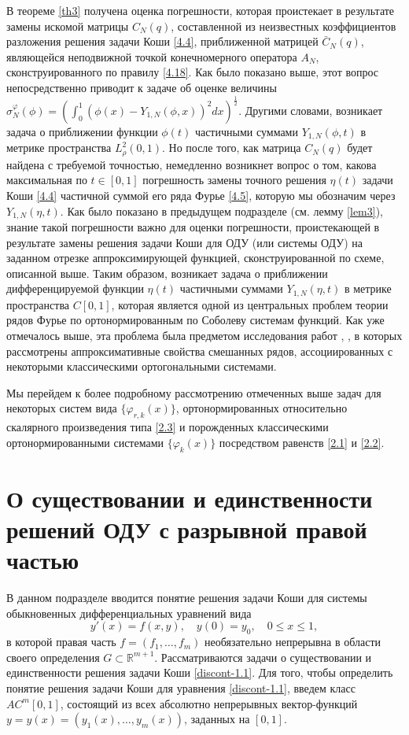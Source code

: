 В теореме \ref{th3} получена оценка  погрешности, которая проистекает в результате замены искомой матрицы $C_N(q)$, составленной из неизвестных коэффициентов  разложения решения задачи Коши \eqref{4.4}, приближенной матрицей $\bar C_N(q)$, являющейся неподвижной точкой конечномерного оператора $A_N$, сконструированного по правилу \eqref{4.18}.
Как было показано выше, этот вопрос непосредственно приводит к задаче об оценке величины  $\sigma_N^\varphi(\phi)=(\int_{0}^1(\phi(x)- Y_{1,N}(\phi,x))^2 dx)^\frac12$. Другими словами, возникает задача о приближении функции $\phi(t)$ частичными суммами $Y_{1,N}(\phi,t)$  в метрике пространства $L^2_\rho(0,1)$.
Но после того, как  матрица $C_N(q)$ будет найдена с требуемой точностью, немедленно возникнет вопрос о том, какова максимальная по $t\in[0,1]$ погрешность замены точного решения $\eta(t)$ задачи Коши \eqref{4.4} частичной суммой его ряда Фурье \eqref{4.5}, которую мы обозначим через  $Y_{1,N}(\eta,t)$. Как было показано в предыдущем подразделе (см. лемму \ref{lem3}), знание такой погрешности важно для оценки погрешности, проистекающей в результате замены решения задачи Коши для ОДУ (или системы ОДУ) на заданном отрезке  аппроксимирующей функцией, сконструированной по схеме, описанной выше.  Таким образом, возникает задача о приближении  дифференцируемой функции $\eta(t)$ частичными суммами $Y_{1,N}(\eta,t)$ в метрике пространства $C[0,1]$, которая является одной из центральных проблем теории рядов Фурье по ортонормированным по Соболеву системам функций. Как уже отмечалось выше, эта проблема  была предметом исследования  работ  \cite{Shar11, Shar2003, Shar2006, Shar2008, Shar19, Shar18, sharap3, Shar_Dag_Elec, SHII, Shar2017, SharSMJ2017}, \cite{SharIzv2018},  в которых  рассмотрены аппроксимативные свойства смешанных рядов, ассоциированных с некоторыми классическими ортогональными системами.

Мы перейдем к более подробному рассмотрению отмеченных выше задач для некоторых  систем вида $\{\varphi_{r,k}(x)\}$, ортонормированных относительно скалярного произведения типа \eqref{2.3} и порожденных классическими ортонормированными системами $\{\varphi_k(x)\}$ посредством равенств  \eqref{2.1} и \eqref{2.2}.



\section{О существовании и единственности решений ОДУ с разрывной правой частью}

В данном подразделе вводится понятие решения задачи Коши для системы обыкновенных дифференциальных уравнений вида
\begin{equation}\label{discont-1.1}
y'(x)=f(x,y),\quad y(0)=y_0, \quad 0\le x\le 1,
\end{equation}
в которой правая часть  $f=(f_1,\ldots,f_m)$ необязательно непрерывна в области своего определения $G\subset\mathbb{R}^{m+1}$. Рассматриваются задачи о существовании и единственности решения задачи Коши \eqref{discont-1.1}. Для того, чтобы определить понятие  решения задачи Коши для уравнения \eqref{discont-1.1}, введем класс  $AC^m[0,1]$, состоящий из всех абсолютно непрерывных вектор-функций $y=y(x)=(y_1(x),\ldots,y_m(x))$, заданных на $[0,1]$.


